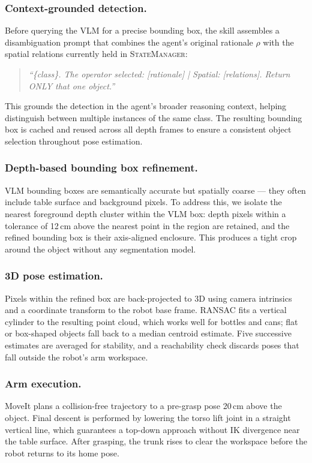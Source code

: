 \documentclass[twocolumn,10pt]{article}
\newcommand{\SM}{\textsc{StateManager}}
\begin{document}
\subsubsection{Context-grounded detection.}
Before querying the VLM for a precise bounding box, the skill assembles
a disambiguation prompt that combines the agent's original rationale $\rho$
with the spatial relations currently held in \SM{}:
\begin{quote}\small\itshape
``\{class\}. The operator selected: [\textit{rationale}] | Spatial: [\textit{relations}].
Return ONLY that one object.''
\end{quote}
This grounds the detection in the agent's broader reasoning context,
helping distinguish between multiple instances of the same class.
The resulting bounding box is cached and reused across all depth frames
to ensure a consistent object selection throughout pose estimation.

\subsubsection{Depth-based bounding box refinement.}
VLM bounding boxes are semantically accurate but spatially coarse —
they often include table surface and background pixels.
To address this, we isolate the nearest foreground depth cluster within
the VLM box: depth pixels within a tolerance of 12\,cm above the nearest
point in the region are retained, and the refined bounding box is their
axis-aligned enclosure.
This produces a tight crop around the object without any segmentation model.

\subsubsection{3D pose estimation.}
Pixels within the refined box are back-projected to 3D using camera
intrinsics and a coordinate transform to the robot base frame.
RANSAC fits a vertical cylinder to the resulting point cloud, which works
well for bottles and cans; flat or box-shaped objects fall back to a
median centroid estimate.
Five successive estimates are averaged for stability, and a reachability
check discards poses that fall outside the robot's arm workspace.

\subsubsection{Arm execution.}
MoveIt plans a collision-free trajectory to a pre-grasp pose 20\,cm
above the object.
Final descent is performed by lowering the torso lift joint in a straight
vertical line, which guarantees a top-down approach without IK divergence
near the table surface.
After grasping, the trunk rises to clear the workspace before the robot
returns to its home pose.
\end{document}
